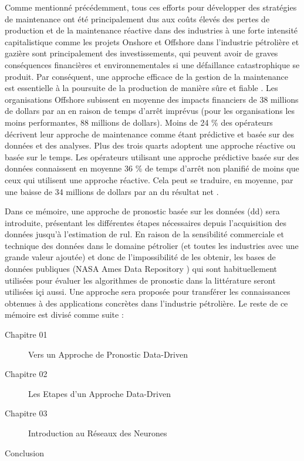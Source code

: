 Comme mentionné précédemment, tous ces efforts pour développer des stratégies de maintenance ont été principalement dus aux coûts élevés des pertes de production et de la maintenance réactive dans des industries à une forte intensité capitalistique comme les projets Onshore et Offshore dans l'industrie pétrolière et gazière sont principalement des investissements, qui peuvent avoir de graves conséquences financières et environnementales si une défaillance catastrophique se produit. Par conséquent, une approche efficace de la gestion de la maintenance est essentielle à la poursuite de la production de manière sûre et fiable \cite{Telford2011}. Les organisations Offshore subissent en moyenne des impacts financiers de 38 millions de dollars par an en raison de temps d'arrêt imprévus (pour les organisations les moins performantes, 88 millions de dollars). Moins de 24 \% des opérateurs décrivent leur approche de maintenance comme étant prédictive et basée sur des données et des analyses. Plus des trois quarts adoptent une approche réactive ou basée sur le temps. Les opérateurs utilisant une approche prédictive basée sur des données connaissent en moyenne 36 \% de temps d'arrêt non planifié de moins que ceux qui utilisent une approche réactive. Cela peut se traduire, en moyenne, par une baisse de 34 millions de dollars par an du résultat net \cite{Eriksen2016}.

Dans ce mémoire, une approche de pronostic basée sur les données (\acrlong{dd}) sera introduite, présentant les différentes étapes nécessaires depuis l'acquisition des données jusqu'à l'estimation de \acrshort{rul}. En raison de la sensibilité commerciale et technique des données dans le domaine pétrolier (et toutes les industries avec une grande valeur ajoutée) et donc de l'impossibilité de les obtenir, les bases de données publiques (NASA Ames Data Repository \cite{NASAAmes}) qui sont habituellement utilisées pour évaluer les algorithmes de pronostic dans la littérature seront utilisées içi aussi. Une approche sera proposée pour transférer les connaissances obtenues à des applications concrètes dans l'industrie pétrolière.
\newline
Le reste de ce mémoire est divisé comme suite :
\begin{description}
	\item[Chapitre 01] Vers un Approche de Pronostic Data-Driven
	\item[Chapitre 02] Les Etapes d'un Approche Data-Driven
	\item[Chapitre 03] Introduction au Réseaux des Neurones  
	\item[Conclusion] 
\end{description}




